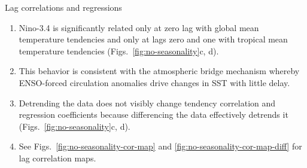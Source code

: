 \documentclass[aspectratio=169,xcolor=dvipsnames]{beamer}
\begin{document}
\begin{frame}{Lag correlations and regressions}
\begin{minipage}[h]{0.50\linewidth}
\begin{enumerate}
    \item Nino-3.4 is significantly related only at zero lag with
      global mean temperature tendencies and only at lags zero and one
      with tropical mean temperature tendencies (Figs.\
      \ref{fig:no-seasonality}c, d).
    \item This behavior is consistent with the atmospheric bridge
      mechanism \citep{Klein1999remote} whereby ENSO-forced
      circulation anomalies drive changes in SST with little delay.
    \item Detrending the data does not visibly change tendency
      correlation and regression coefficients because differencing the
      data effectively detrends it (Figs.\ \ref{fig:no-seasonality}c,
      d).
    \item See Figs.\ \ref{fig:no-seasonality-cor-map} and
      \ref{fig:no-seasonality-cor-map-diff} for lag correlation maps.
    \end{enumerate}
  \end{minipage}
\end{frame}
\end{document}
